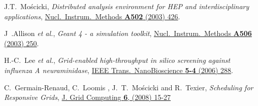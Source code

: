 \documentclass{elsart}
\def\etal {\textit{et al.}}
\begin{document}
\begin{thebibliography}{00}
 J.T.~Mo\'scicki,
\textit{Distributed analysis environment for HEP and interdisciplinary
applications},
\href{http://dx.doi.org/10.1016/S0168-9002(03)00459-5}
{Nucl.\ Instrum.\ Methods \textbf{A502} (2003) 426}.

 J~.Allison \etal,
\textit{Geant 4 - a simulation toolkit},
\href{http://dx.doi.org/10.1016/S0168-9002(03)01368-8}
{Nucl.\ Instrum.\ Methods \textbf{A506} (2003) 250}.

 H.-C.\ Lee \etal,
\textit{Grid-enabled high-throughput in silico screening against influenza A
neuraminidase},
\href{http://dx.doi.org/10.1109/TNB.2006.887943}
{IEEE Trans.\ NanoBioscience \textbf{5-4} (2006) 288}.

  C.~Germain-Renaud, C.~Loomis , J.~T.~Mo{\'s}cicki and R.~Texier,
\textit{Scheduling for Responsive Grids}, 
\href{http://dx/doi.org/10.1007/s10723-007-9086-4}
{J. Grid Computing \textbf{6}, (2008) 15-27 }







\end{thebibliography}
\end{document}
